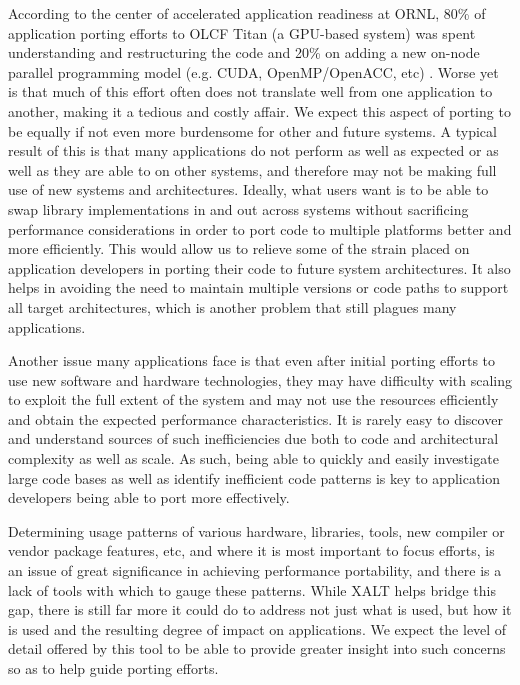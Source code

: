 According to the center of accelerated application readiness at \acs{ORNL}, 80\% of application porting efforts to OLCF Titan (a \acs{GPU}-based system) was spent understanding and restructuring the code and 20\% on adding a new on-node parallel programming model (e.g. CUDA, OpenMP/OpenACC, etc) \cite{titan}.
Worse yet is that much of this effort often does not translate well from one application to another, making it a tedious and costly affair.
We expect this aspect of porting to be equally if not even more burdensome for other and future systems.
A typical result of this is that many applications do not perform as well as expected or as well as they are able to on other systems, and therefore may not be making full use of new systems and architectures.
Ideally, what users want is to be able to swap library implementations in and out across systems without sacrificing performance considerations in order to port code to multiple platforms better and more efficiently.
This would allow us to relieve some of the strain placed on application developers in porting their code to future system architectures.
It also helps in avoiding the need to maintain multiple versions or code paths to support all target architectures, which is another problem that still plagues many applications.

Another issue many applications face is that even after initial porting efforts to use new software and hardware technologies, they may have difficulty with scaling to exploit the full extent of the system and may not use the resources efficiently and obtain the expected performance characteristics.
It is rarely easy to discover and understand sources of such inefficiencies due both to code and architectural complexity as well as scale.
As such, being able to quickly and easily investigate large code bases as well as identify inefficient code patterns is key to application developers being able to port more effectively.

Determining usage patterns of various hardware, libraries, tools, new compiler or vendor package features, etc, and where it is most important to focus efforts, is an issue of great significance in achieving performance portability, and there is a lack of tools with which to gauge these patterns.
While XALT helps bridge this gap, there is still far more it could do to address not just what is used, but how it is used and the resulting degree of impact on applications.
We expect the level of detail offered by this tool to be able to provide greater insight into such concerns so as to help guide porting efforts.

